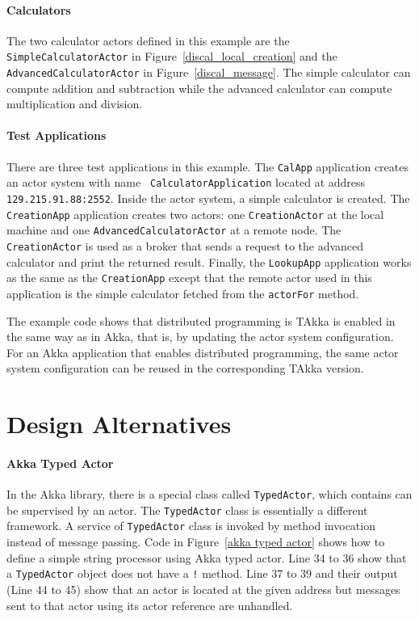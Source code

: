 \paragraph{Calculators} The two calculator actors defined in this example are 
the \\ {\tt SimpleCalculatorActor} in Figure~\ref{discal_local_creation} and 
the {\tt AdvancedCalculatorActor} in Figure~\ref{discal_message}.  The simple 
calculator can compute addition and subtraction while the advanced calculator 
can compute multiplication and division.


\paragraph{Test Applications} There are three test applications in this example.
The {\tt CalApp} application creates an actor system with name {\tt 
CalculatorApplication} located at address {\tt 129.215.91.88:2552}.  Inside the 
actor system, a simple calculator is created.  The {\tt CreationApp} 
application creates two actors: one {\tt CreationActor} at the local machine 
and one {\tt AdvancedCalculatorActor} at a remote node.  The {\tt 
CreationActor} is used as a broker that sends a request to the advanced 
calculator and print the returned result.  Finally, the {\tt LookupApp} 
application works as the same as the {\tt CreationApp} except that the remote 
actor used in this application is the simple calculator fetched from the 
{\tt actorFor} method.

\vspace{12 pt}

The example code shows that distributed programming is TAkka is enabled in the 
same way as in Akka, that is, by updating the actor system configuration.  For 
an Akka application that enables distributed programming, the same actor system 
configuration can be reused in the corresponding TAkka version.


\newpage

\section{Design Alternatives}
\label{alternative_designs}

\paragraph{Akka Typed Actor}
In the Akka library, there is a special class called {\tt TypedActor}, which
contains can be supervised by an actor.  The {\tt TypedActor} class is essentially
a different framework.  A service of {\tt TypedActor} class is invoked by method 
invocation instead of message passing.  Code in Figure~\ref{akka typed actor} shows 
how to define a simple string processor using Akka typed actor.  
Line 34 to 36 show that a {\tt TypedActor} object does not have a {\tt !} method.
Line 37 to 39 and their output (Line 44 to 45) show that an actor is located at 
the given address but messages sent to that actor using its actor reference are
unhandled.


